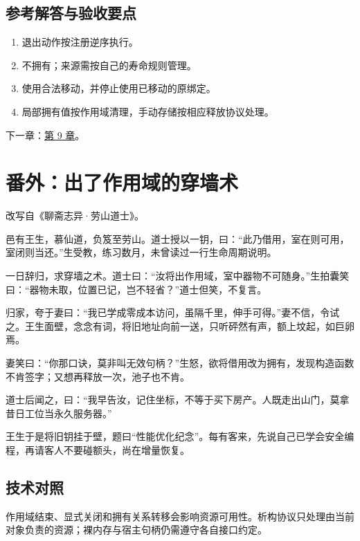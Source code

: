 \subsection*{参考解答与验收要点}

\begin{enumerate}

\item 退出动作按注册逆序执行。

\item 不拥有；来源需按自己的寿命规则管理。

\item 使用合法移动，并停止使用已移动的原绑定。

\item 局部拥有值按作用域清理，手动存储按相应释放协议处理。

\end{enumerate}

下一章：\hyperref[ch:09]{第 9 章}。

\section{番外：出了作用域的穿墙术}

改写自《聊斋志异·劳山道士》。

邑有王生，慕仙道，负笈至劳山。道士授以一钥，曰：“此乃借用，室在则可用，室闭则当还。”生受教，练习数月，未曾读过一行生命周期说明。

一日辞归，求穿墙之术。道士曰：“汝将出作用域，室中器物不可随身。”生拍囊笑曰：“器物未取，位置已记，岂不轻省？”道士但笑，不复言。

归家，夸于妻曰：“我已学成零成本访问，虽隔千里，伸手可得。”妻不信，令试之。王生面壁，念念有词，将旧地址向前一送，只听砰然有声，额上坟起，如巨卵焉。

妻笑曰：“你那口诀，莫非叫无效句柄？”生怒，欲将借用改为拥有，发现构造函数不肯签字；又想再释放一次，池子也不肯。

道士后闻之，曰：“我早告汝，记住坐标，不等于买下房产。人既走出山门，莫拿昔日工位当永久服务器。”

王生于是将旧钥挂于壁，题曰“性能优化纪念”。每有客来，先说自己已学会安全编程，再请客人不要碰额头，尚在增量恢复。

\subsection*{技术对照}

作用域结束、显式关闭和拥有关系转移会影响资源可用性。析构协议只处理由当前对象负责的资源；裸内存与宿主句柄仍需遵守各自接口约定。
